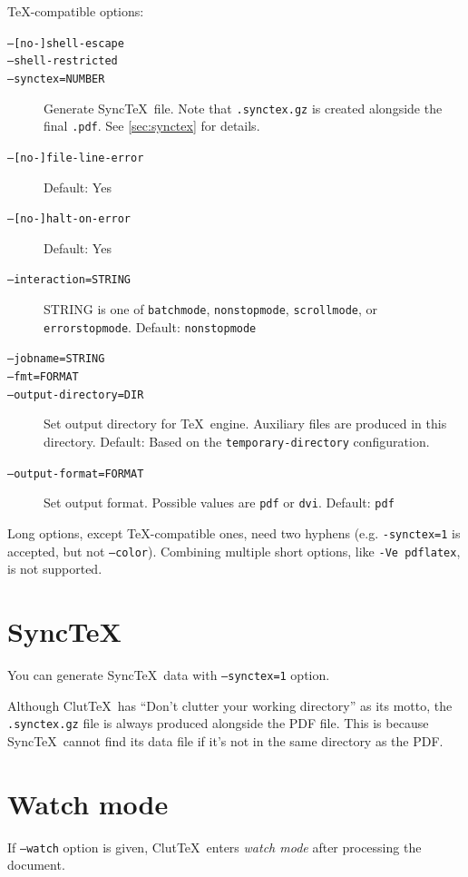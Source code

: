 \documentclass[a4paper]{report}
\newcommand\ClutTeX{Clut\TeX}
\newcommand\metavar[1]{\textnormal{\textsf{#1}}}
\begin{document}
\TeX-compatible options:
\begin{description}
\item[\texttt{--[no-]shell-escape}]
\item[\texttt{--shell-restricted}]
\item[\texttt{--synctex=\metavar{NUMBER}}]
  Generate Sync\TeX\ file.
  Note that \texttt{.synctex.gz} is created alongside the final \texttt{.pdf}.
  See \autoref{sec:synctex} for details.
\item[\texttt{--[no-]file-line-error}]
  Default: Yes
\item[\texttt{--[no-]halt-on-error}]
  Default: Yes
\item[\texttt{--interaction=\metavar{STRING}}]
  \metavar{STRING} is one of \texttt{batchmode}, \texttt{nonstopmode}, \texttt{scrollmode}, or \texttt{errorstopmode}.
  Default: \texttt{nonstopmode}
\item[\texttt{--jobname=\metavar{STRING}}]
\item[\texttt{--fmt=\metavar{FORMAT}}]
\item[\texttt{--output-directory=\metavar{DIR}}]
  Set output directory for \TeX\ engine.
  Auxiliary files are produced in this directory.
  Default: Based on the \texttt{temporary-directory} configuration.
\item[\texttt{--output-format=\metavar{FORMAT}}]
  Set output format.
  Possible values are \texttt{pdf} or \texttt{dvi}.
  Default: \texttt{pdf}
\end{description}

Long options, except \TeX-compatible ones, need two hyphens (e.g. \texttt{-synctex=1} is accepted, but not \texttt{--color}).
Combining multiple short options, like \texttt{-Ve pdflatex}, is not supported.

\section{Sync\TeX}\label{sec:synctex}
You can generate Sync\TeX\ data with \texttt{--synctex=1} option.

Although \ClutTeX\ has ``Don't clutter your working directory'' as its motto, the \texttt{.synctex.gz} file is always produced alongside the PDF file.
This is because Sync\TeX\ cannot find its data file if it's not in the same directory as the PDF.

\section{Watch mode}\label{sec:watch-mode}
If \texttt{--watch} option is given, \ClutTeX\ enters \emph{watch mode} after processing the document.
\end{document}
